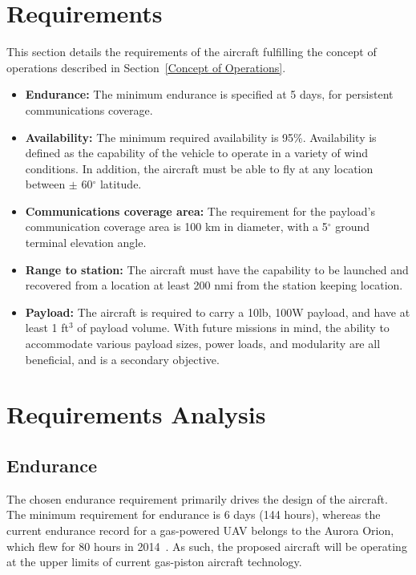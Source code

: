 \documentclass[journal]{aiaa-tc}%
\begin{document}
\section{Requirements}

This section details the requirements of the aircraft fulfilling the concept of operations described in Section~\ref{Concept of Operations}.

\begin{itemize}
    \item \textbf{Endurance: } The minimum endurance is specified at 5 days, for persistent communications coverage. 
    \item \textbf{Availability: } The minimum required availability is 95\%. Availability is defined as the capability of the vehicle to operate in a variety of wind conditions. In addition, the aircraft must be able to fly at any location between $\pm$ 60$^{\circ}$ latitude.
    \item \textbf{Communications coverage area: } The requirement for the payload's communication coverage area is 100 km in diameter, with a 5$^{\circ}$ ground terminal elevation angle. 
    \item \textbf{Range to station: } The aircraft must have the capability to be launched and recovered from a location at least 200 nmi from the station keeping location.
    \item \textbf{Payload: } The aircraft is required to carry a 10lb, 100W payload, and have at least 1 ft$^3$ of payload volume. With future missions in mind, the ability to accommodate various payload sizes, power loads, and modularity are all beneficial, and is a secondary objective.
\end{itemize}

\section{Requirements Analysis}

\subsection{Endurance}

The chosen endurance requirement primarily drives the design of the aircraft. The minimum requirement for endurance is 6 days (144 hours), whereas the current endurance record for a gas-powered UAV belongs to the Aurora Orion, which flew for 80 hours in 2014~\cite{FAIrecords}. As such, the proposed aircraft will be operating at the upper limits of current gas-piston aircraft technology. 
\end{document}
